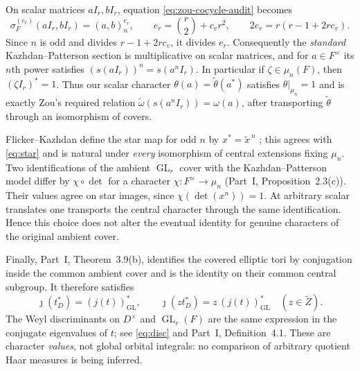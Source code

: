 \documentclass[11pt]{article}
\newcommand{\GL}{\operatorname{GL}}
\newcommand{\tZ}{\widetilde Z}
\theoremstyle{plain}
\theoremstyle{definition}
\begin{document}
On scalar matrices $aI_r,bI_r$, equation
\eqref{eq:zou-cocycle-audit} becomes
\begin{equation}\label{eq:scalar-audit}
 \sigma_F^{(c_v)}(aI_r,bI_r)=(a,b)_n^{e_r},
 \qquad e_r=\binom r2+c_vr^2,
 \qquad 2e_r=r(r-1+2rc_v).
\end{equation}
Since $n$ is odd and divides $r-1+2rc_v$, it divides $e_r$.
Consequently the \emph{standard} Kazhdan--Patterson section is
multiplicative on scalar matrices, and for $a\in F^\times$ its
$n$th power satisfies $(s(aI_r))^n=s(a^n I_r)$.
In particular if $\zeta\in\mu_n(F)$, then $(\zeta I_r)^*=1$.
Thus our scalar character
$\theta(a)=\widetilde\theta(a^*)$ satisfies
$\theta|_{\mu_n}=1$ and is exactly Zou's required relation
$\widetilde\omega(s(a^nI_r))=\omega(a)$, after transporting
$\widetilde\theta$ through an isomorphism of covers.

Flicker--Kazhdan define the star map for odd $n$ by
$x^*=\widetilde x^{\,n}$ \cite[\S4]{FK86}; this agrees with
\eqref{eq:star} and is natural under \emph{every} isomorphism of
central extensions fixing $\mu_n$.  Two identifications of the
ambient $\GL_r$ cover with the Kazhdan--Patterson model differ
by $\chi\circ\det$ for a character $\chi:F^\times\to\mu_n$
(Part~I, Proposition~2.3(c)).  Their values agree on star images,
since $\chi(\det(x^n))=1$.  At arbitrary scalar translates one
transports the central character through the same identification.
Hence this choice does not alter the eventual identity for genuine
characters of the original ambient cover.

Finally, Part~I, Theorem~3.9(b), identifies the covered elliptic
tori by conjugation inside the common ambient cover and is the
identity on their common central subgroup.  It therefore satisfies
\begin{equation}\label{eq:jstar-audit}
 \jmath(t_D^*)=(j(t))_{\GL}^*,\qquad
 \jmath(z t_D^*)=z\,(j(t))_{\GL}^*
 \quad(z\in\tZ).
\end{equation}
The Weyl discriminants on $D^\times$ and $\GL_r(F)$ are the same
expression in the conjugate eigenvalues of $t$; see
\eqref{eq:disc} and Part~I, Definition~4.1.
These are character \emph{values}, not global orbital integrals:
no comparison of arbitrary quotient Haar measures is being inferred.
\end{document}
